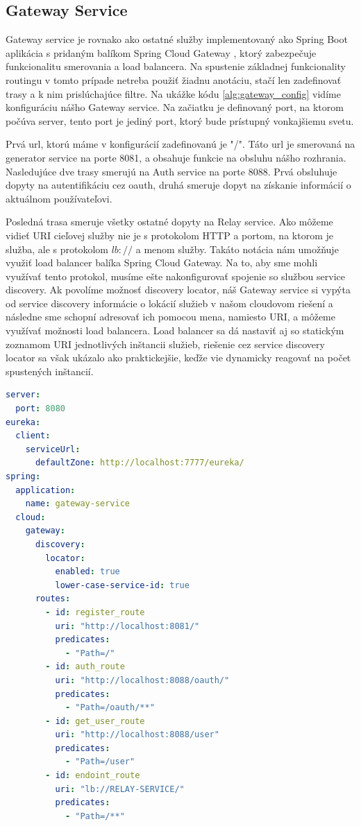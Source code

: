 \subsection{Gateway Service}
Gateway service je rovnako ako ostatné služby implementovaný ako Spring Boot aplikácia s pridaným balíkom Spring Cloud Gateway \cite{cloud_gateway}, ktorý zabezpečuje funkcionalitu smerovania a load balancera.
Na spustenie základnej funkcionality routingu v tomto prípade netreba použiť žiadnu anotáciu, stačí len zadefinovať trasy a k nim prislúchajúce filtre. Na ukážke kódu \ref{alg:gateway_config} vidíme konfiguráciu nášho Gateway service. Na začiatku je definovaný port, na ktorom počúva server, tento port je jediný port, ktorý bude prístupný vonkajšiemu svetu.

Prvá \acrshort{url}, ktorú máme v konfigurácií zadefinovanú je "/". Táto \acrshort{url} je smerovaná na generator service na porte 8081, a obsahuje funkcie na obsluhu nášho rozhrania.
Nasledujúce dve trasy smerujú na Auth service na porte 8088. Prvá obsluhuje dopyty na autentifikáciu cez \acrshort{oauth}, druhá smeruje dopyt na získanie informácií o aktuálnom používateľovi.

Posledná trasa smeruje všetky ostatné dopyty na Relay service. Ako môžeme vidieť URI cieľovej služby nie je s protokolom HTTP a portom, na ktorom je služba, ale s protokolom $lb://$ a menom služby. Takáto notácia nám umožňuje využiť load balancer balíka Spring Cloud Gateway. Na to, aby sme mohli využívať tento protokol, musíme ešte nakonfigurovať spojenie so službou service discovery. Ak povolíme možnosť discovery locator, náš Gateway service si vypýta od service discovery informácie o lokácií služieb v našom cloudovom riešení a následne sme schopní adresovať ich pomocou mena, namiesto URI, a môžeme využívať možnosti load balancera. Load balancer sa dá nastaviť aj so statickým zoznamom URI jednotlivých inštancii služieb, riešenie cez service discovery locator sa však ukázalo ako praktickejšie, keďže vie dynamicky reagovať na počet spustených inštancií.

\begin{lstlisting}[float, caption={Konfigurácia Gateway service},label={alg:gateway_config},language=yaml]
server:
  port: 8080
eureka:
  client:
    serviceUrl:
      defaultZone: http://localhost:7777/eureka/
spring:
  application:
    name: gateway-service
  cloud:
    gateway:
      discovery:
        locator:
          enabled: true
          lower-case-service-id: true
      routes:
        - id: register_route
          uri: "http://localhost:8081/"
          predicates:
            - "Path=/"
        - id: auth_route
          uri: "http://localhost:8088/oauth/"
          predicates:
            - "Path=/oauth/**"
        - id: get_user_route
          uri: "http://localhost:8088/user"
          predicates:
            - "Path=/user"
        - id: endoint_route
          uri: "lb://RELAY-SERVICE/"
          predicates:
            - "Path=/**"
\end{lstlisting}

